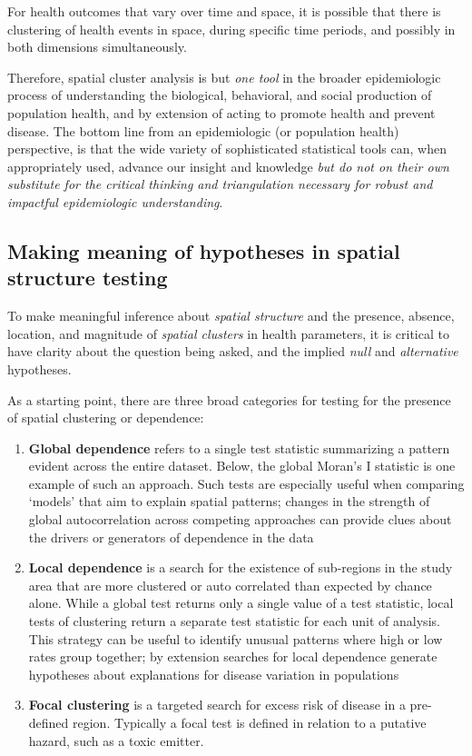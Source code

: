 \documentclass[
]{book}
\providecommand{\tightlist}{%
  \setlength{\itemsep}{0pt}\setlength{\parskip}{0pt}}
\begin{document}
For health outcomes that vary over time and space, it is possible that there is clustering of health events in space, during specific time periods, and possibly in both dimensions simultaneously.

Therefore, spatial cluster analysis is but \emph{one tool} in the broader epidemiologic process of understanding the biological, behavioral, and social production of population health, and by extension of acting to promote health and prevent disease. The bottom line from an epidemiologic (or population health) perspective, is that the wide variety of sophisticated statistical tools can, when appropriately used, advance our insight and knowledge \emph{but do not on their own substitute for the critical thinking and triangulation necessary for robust and impactful epidemiologic understanding}.

\hypertarget{making-meaning-of-hypotheses-in-spatial-structure-testing}{%
\subsection{Making meaning of hypotheses in spatial structure testing}\label{making-meaning-of-hypotheses-in-spatial-structure-testing}}

To make meaningful inference about \emph{spatial structure} and the presence, absence, location, and magnitude of \emph{spatial clusters} in health parameters, it is critical to have clarity about the question being asked, and the implied \emph{null} and \emph{alternative} hypotheses.

As a starting point, there are three broad categories for testing for the presence of spatial clustering or dependence:

\begin{enumerate}
\def\labelenumi{\arabic{enumi}.}
\tightlist
\item
  \textbf{Global dependence} refers to a single test statistic summarizing a pattern evident across the entire dataset. Below, the global Moran's I statistic is one example of such an approach. Such tests are especially useful when comparing `models' that aim to explain spatial patterns; changes in the strength of global autocorrelation across competing approaches can provide clues about the drivers or generators of dependence in the data
\item
  \textbf{Local dependence} is a search for the existence of sub-regions in the study area that are more clustered or auto correlated than expected by chance alone. While a global test returns only a single value of a test statistic, local tests of clustering return a separate test statistic for each unit of analysis. This strategy can be useful to identify unusual patterns where high or low rates group together; by extension searches for local dependence generate hypotheses about explanations for disease variation in populations
\item
  \textbf{Focal clustering} is a targeted search for excess risk of disease in a pre-defined region. Typically a focal test is defined in relation to a putative hazard, such as a toxic emitter.
\end{enumerate}
\end{document}

